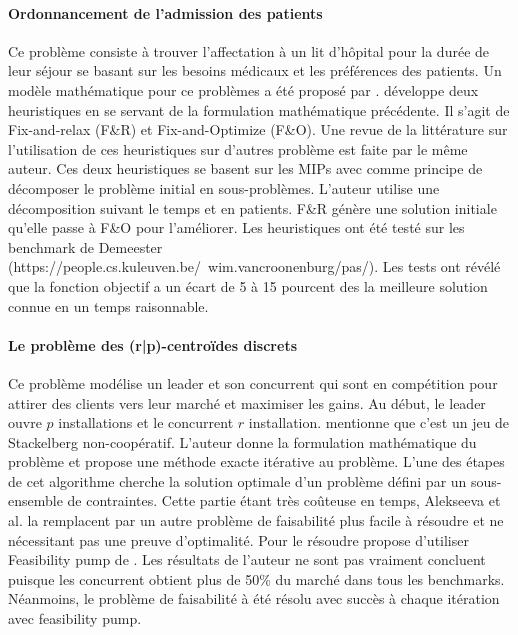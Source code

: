 \documentclass[12pt,a4paper,oneside]{book}
\theoremstyle{definition}
\begin{document}
	    \paragraph{Ordonnancement de l'admission des patients}
	    
	    Ce problème consiste à trouver l'affectation à un lit d'hôpital pour la durée de leur séjour se basant sur les besoins médicaux et les préférences des patients. Un modèle mathématique pour ce problèmes a été proposé par \cite{Ceschia2011}. \cite{Turhan2017} développe deux heuristiques en se servant de la formulation mathématique précédente. Il s'agit de Fix-and-relax (F\&R) et Fix-and-Optimize (F\&O). Une revue de la littérature sur l'utilisation de ces heuristiques sur d'autres problème est faite par le même auteur. Ces deux heuristiques se basent sur les MIPs avec comme principe de décomposer le problème initial en sous-problèmes. L'auteur utilise une décomposition suivant le temps et en patients. F&R génère une solution initiale qu'elle passe à F&O pour l'améliorer.
	    Les heuristiques ont été testé sur les benchmark de Demeester (https://people.cs.kuleuven.be/~wim.vancroonenburg/pas/). Les tests ont révélé que la fonction objectif a un écart de 5 à 15 pourcent des la meilleure solution connue en un temps raisonnable.  
	    
	    \paragraph{Le problème des (r|p)-centroïdes discrets}
	    
	    Ce problème modélise un leader et son concurrent qui sont en compétition pour attirer des clients vers leur marché et maximiser les gains. Au début, le leader ouvre $p$ installations et le concurrent $r$ installation. \cite{Alekseeva2010} mentionne que c'est un jeu de Stackelberg non-coopératif. L'auteur donne la formulation mathématique du problème et propose une méthode exacte itérative au problème. L'une des étapes de cet algorithme cherche la solution optimale d'un problème défini par un sous-ensemble de contraintes. Cette partie étant très coûteuse en temps, Alekseeva et al. la remplacent par un autre problème de faisabilité plus facile à résoudre et ne nécessitant pas une preuve d'optimalité. Pour le résoudre \cite{Alekseeva2010} propose d'utiliser Feasibility pump de \cite{Fischetti2005}. Les résultats de l'auteur ne sont pas vraiment concluent puisque les concurrent obtient plus de 50\% du marché dans tous les benchmarks. Néanmoins, le problème de faisabilité à été résolu avec succès à chaque itération avec feasibility pump.
	    
\end{document}

